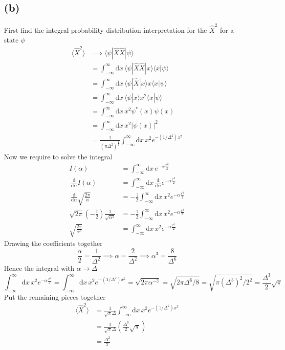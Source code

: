 \documentclass[letterpaper]{article}
\begin{document}
\subsection*{(b)} 
First find the integral probability distribution interpretation for the $\hat{X}^2$ for a state $\psi$
\begin{align*}
	\langle \hat{X}^2 \rangle &\implies \langle \psi |  \hat{X} \hat{X} | \psi \rangle   \\ 
&= \int_{-\infty}^{\infty} \mathrm{d} x \, \langle \psi | \hat{X} \hat{X} | x \rangle  \langle x | \psi \rangle   \\
&= \int_{-\infty}^{\infty} \mathrm{d} x \, \langle \psi | \hat{X} | x \rangle  x  \langle x | \psi \rangle   \\
&= \int_{-\infty}^{\infty} \mathrm{d} x \, \langle \psi |  x \rangle  x^2  \langle x | \psi \rangle   \\ 
&= \int_{-\infty}^{\infty} \mathrm{d} x \, 
	x^2 \psi^*(x) \psi(x) 
\\	&= \int_{-\infty}^{\infty} \mathrm{d} x \, x^2 | \psi(x) |^2   \\
	&= \frac{1}{(\pi \Delta ^2)^{\frac{1}{2}}} \int_{-\infty}^{\infty} \mathrm{d} x \,  x^2 e^{- (1 /  \Delta ^2) x^2} 
\end{align*}
Now we require to solve the integral
\begin{align*}
	I(\alpha) &= \int_{-\infty}^{\infty} \mathrm{d} x \, e^{- \alpha \frac{x^2}{2}}  \\ 
	\ \frac{\mathrm{d} }{\mathrm{d} \alpha} I(\alpha) &= 
\int_{-\infty}^{\infty} \mathrm{d}  x \, \frac{\mathrm{d} }{\mathrm{d} \alpha} 
e^{ - \alpha \frac{x^2}{2}} 
	\\
	\ \frac{\mathrm{d} }{\mathrm{d} \alpha} \sqrt{\frac{2\pi}{\alpha}} &= 
	- \frac{1}{2} \int_{- \infty}^{\infty} \mathrm{d} x \, x^2 e^{- \alpha \frac{x^2}{2}}  \\ 
	\sqrt{2 \pi } \left(- \frac{1}{2}\right) \frac{1}{\sqrt{\alpha^3} }
									    &	= - \frac{1}{2} \int_{- \infty}^{\infty} \mathrm{d} x \, x^2 e^{- \alpha \frac{x^2}{2}}  \\ 
	\sqrt{ \frac{2 \pi  }{\alpha^3} } &= \int_{-\infty}^{\infty} \mathrm{d} x \, x^2 e^{- \alpha \frac{x^2}{2}} 
\end{align*}
Drawing the coefficients together 
\[
\frac{\alpha}{ 2} = \frac{1}{\Delta ^2 } \implies \alpha = \frac{2}{\Delta ^2} \implies 
\alpha^3 = \frac{8}{\Delta ^{6}}
\]
Hence the integral with $\alpha \to  \Delta$
\[
\int_{-\infty}^{\infty} \mathrm{d} x \, x^2 e^{ - \alpha \frac{x^2}{2}} = 
\int_{-\infty}^{\infty} \mathrm{d} x \, x^2 e^{ - ( 1 / \Delta ^2) x^2 } = 
\sqrt{2 \pi \alpha ^{-3} } = 
\sqrt{2 \pi \Delta^{6} / 8}  = \sqrt{\pi (\Delta ^3)^2 / 2 ^2 }  = \frac{\Delta^3}{2} \sqrt{\pi} 
\] 
Put the remaining pieces together
\begin{align*}
	\langle \hat{X}^2 \rangle &= \frac{1}{\sqrt{\pi} \Delta } 
	\int_{-\infty}^{\infty} \mathrm{d} x \, x^2 e^{ - (1 / \Delta^2) x^2} \\  
	&= \frac{1}{\sqrt{ \pi } \Delta } \left(\frac{\Delta ^3}{2} \sqrt{{\pi }} \right) \\
	&= \frac{\Delta^2 }{2  } \\
\end{align*}
\end{document}
